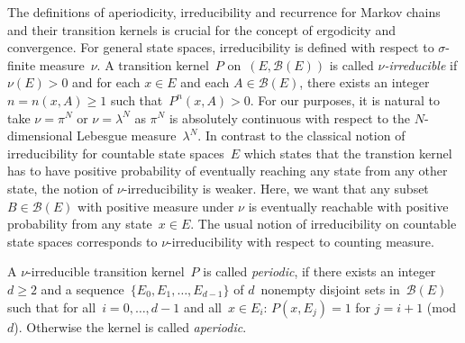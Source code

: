 The definitions of aperiodicity, irreducibility and recurrence for Markov chains and their transition kernels is crucial for the concept of ergodicity and convergence. For general state spaces, irreducibility is defined with respect to $\sigma$-finite measure~$\nu$. A transition kernel~$P$ on~$ \left( E, \mathcal{B}(E) \right) $ is called \textit{$\nu$-irreducible} if $\nu(E) > 0 $ and for each $x \in E$ and each $A \in \mathcal{B}(E)$, there exists an integer $n= n(x,A) \geq 1$ such that~$ P^n (x,A) > 0$. For our purposes, it is natural to take $\nu = \pi^{N}$ or $ \nu = \lambda^{N} $ as $\pi^{N}$ is absolutely continuous with respect to the $N$-dimensional Lebesgue measure~$\lambda^{N}$. In contrast to the classical notion of irreducibility for countable state spaces~$E$ which states that the transtion kernel has to have positive probability of eventually reaching any state from any other state, the notion of $ \nu $-irreducibility is weaker. Here, we want that any subset $B \in \mathcal{B}(E) $ with positive measure under $ \nu $ is eventually reachable with positive probability from any state~$ x \in E $. The usual notion of irreducibility on countable state spaces corresponds to $\nu$-irreducibility with respect to counting measure.

A $\nu$-irreducible transition kernel~$P$ is called \textit{periodic}, if there exists an integer~$d \geq 2$ and a sequence~$\{ E_0, E_1, \dots, E_{d-1} \}$ of $d$~nonempty disjoint sets in~$\mathcal{B}(E)$ such that for all~$i=0,\dots, d-1$ and all~$x \in E_i$: $ P(x, E_j) =1 $ for $ j = i + 1 $ (mod $d$). Otherwise the kernel is called \textit{aperiodic}.

